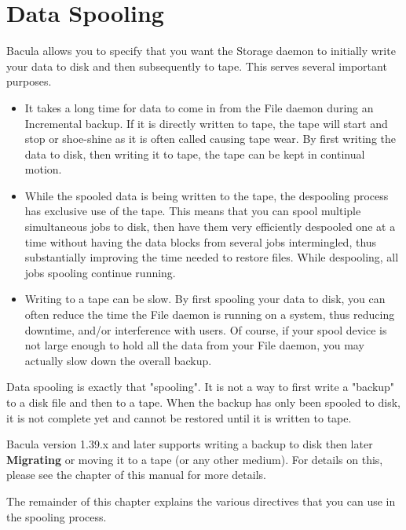 
\chapter{Data Spooling}
\label{SpoolingChapter}

Bacula allows you to specify that you want the Storage daemon to initially
write your data to disk and then subsequently to tape. This serves several
important purposes. 

\begin{itemize}
\item It takes a long time for data to come in from the File daemon during
   an Incremental backup.  If it is directly written to tape, the tape will
   start and stop or shoe-shine as it is often called causing tape wear.
   By first writing the data to disk, then writing it to tape, the tape can
   be kept in continual motion.
\item While the spooled data is being written to the tape, the despooling
   process has exclusive use of the tape.  This means that you can spool
   multiple simultaneous jobs to disk, then have them very efficiently
   despooled one at a time without having the data blocks from several jobs
   intermingled, thus substantially improving the time needed to restore
   files. While despooling, all jobs spooling continue running.
\item Writing to a tape can be slow.  By first spooling your data to disk,
   you can often reduce the time the File daemon is running on a system,
   thus reducing downtime, and/or interference with users.  Of course, if
   your spool device is not large enough to hold all the data from your
   File daemon, you may actually slow down the overall backup.
\end{itemize}

Data spooling is exactly that "spooling".  It is not a way to first write a
"backup" to a disk file and then to a tape.  When the backup has only been
spooled to disk, it is not complete yet and cannot be restored until it is
written to tape.  

Bacula version 1.39.x and later supports writing a backup
to disk then later {\bf Migrating} or moving it to a tape (or any
other medium). For
details on this, please see the  chapter
of this manual for more details.

The remainder of this chapter explains the various directives that you can use
in the spooling process. 

